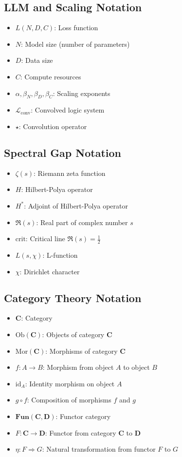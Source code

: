 \subsection{LLM and Scaling Notation}
\begin{itemize}
\item $L(N, D, C)$: Loss function
\item $N$: Model size (number of parameters)
\item $D$: Data size
\item $C$: Compute resources
\item $\alpha, \beta_N, \beta_D, \beta_C$: Scaling exponents
\item $\mathcal{L}_{\text{conv}}$: Convolved logic system
\item $\star$: Convolution operator
\end{itemize}

\subsection{Spectral Gap Notation}
\begin{itemize}
\item $\zeta(s)$: Riemann zeta function
\item $H$: Hilbert-Polya operator
\item $H^*$: Adjoint of Hilbert-Polya operator
\item $\Re(s)$: Real part of complex number $s$
\item $\text{crit}$: Critical line $\Re(s) = \frac{1}{2}$
\item $L(s, \chi)$: L-function
\item $\chi$: Dirichlet character
\end{itemize}

\subsection{Category Theory Notation}
\begin{itemize}
\item $\mathbf{C}$: Category
\item $\text{Ob}(\mathbf{C})$: Objects of category $\mathbf{C}$
\item $\text{Mor}(\mathbf{C})$: Morphisms of category $\mathbf{C}$
\item $f: A \to B$: Morphism from object $A$ to object $B$
\item $\text{id}_A$: Identity morphism on object $A$
\item $g \circ f$: Composition of morphisms $f$ and $g$
\item $\mathbf{Fun}(\mathbf{C}, \mathbf{D})$: Functor category
\item $F: \mathbf{C} \to \mathbf{D}$: Functor from category $\mathbf{C}$ to $\mathbf{D}$
\item $\eta: F \Rightarrow G$: Natural transformation from functor $F$ to $G$
\end{itemize}


